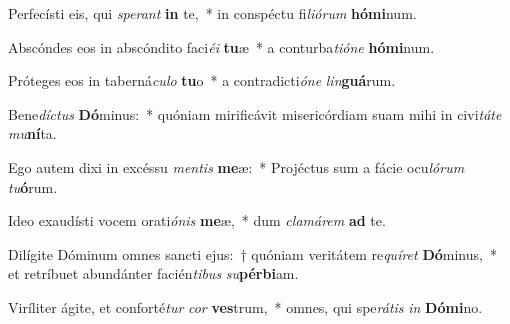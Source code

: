 \item Perfecísti eis, qui \textit{spe}\textit{rant} \textbf{in} te,~* in conspéctu fi\textit{li}\textit{ó}\textit{rum} \textbf{hó}\textbf{mi}num.
\item Abscóndes eos in abscóndito faci\textit{é}\textit{i} \textbf{tu}æ~* a conturba\textit{ti}\textit{ó}\textit{ne} \textbf{hó}\textbf{mi}num.
\item Próteges eos in taberná\textit{cu}\textit{lo} \textbf{tu}o~* a contradicti\textit{ó}\textit{ne} \textit{lin}\textbf{guá}rum.
\item Bene\textit{díc}\textit{tus} \textbf{Dó}minus:~* quóniam mirificávit misericórdiam suam mihi in civi\textit{tá}\textit{te} \textit{mu}\textbf{ní}ta.
\item Ego autem dixi in excéssu \textit{men}\textit{tis} \textbf{me}æ:~* Projéctus sum a fácie ocu\textit{ló}\textit{rum} \textit{tu}\textbf{ó}rum.
\item Ideo exaudísti vocem orati\textit{ó}\textit{nis} \textbf{me}æ,~* dum \textit{cla}\textit{má}\textit{rem} \textbf{ad} te.
\item Dilígite Dóminum omnes sancti ejus:~† quóniam veritátem re\textit{quí}\textit{ret} \textbf{Dó}minus,~* et retríbuet abundánter facién\textit{ti}\textit{bus} \textit{su}\textbf{pér}\textbf{bi}am.
\item Viríliter ágite, et conforté\textit{tur} \textit{cor} \textbf{ves}trum,~* omnes, qui spe\textit{rá}\textit{tis} \textit{in} \textbf{Dó}\textbf{mi}no.
